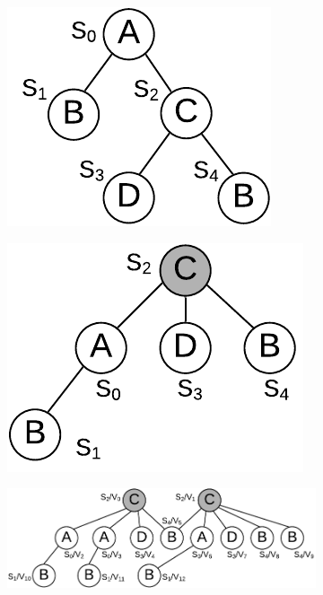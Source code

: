 \begin{figure}[t!]
\begin{subfigure}[b]{0.2\textwidth}
		\includegraphics[scale=0.6]{img_ex/corrq2.pdf}
		\caption{}
		\label{fig:tree_structure3}
	\end{subfigure}%
	\begin{subfigure}[b]{0.25\textwidth}
		\includegraphics[scale=0.6]{img_ex/centerq2.pdf}
		\caption{}
		\label{fig:tree_structure4}
	\end{subfigure}
	\begin{subfigure}[b]{0.5\textwidth}
		\includegraphics[scale=0.6]{img_ex/collectex.pdf}
		\caption{}
		\label{fig:tree_structure5}

\end{subfigure}
\end{figure}
